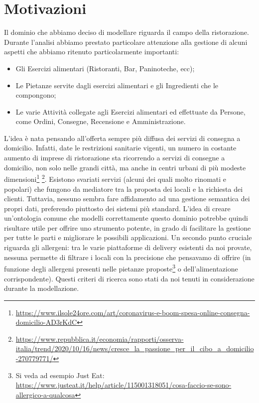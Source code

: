 \documentclass[12pt]{article}
\begin{document}
\section{Motivazioni}
Il dominio che abbiamo deciso di modellare riguarda il campo della ristorazione. 
Durante l'analisi abbiamo prestato particolare attenzione alla gestione di alcuni aspetti che abbiamo ritenuto particolarmente importanti:
\begin{itemize}
    \item Gli Esercizi alimentari (Ristoranti, Bar, Paninoteche, ecc);
    \item Le Pietanze servite dagli esercizi alimentari e gli Ingredienti che le compongono;
    \item Le varie Attività collegate agli Esercizi alimentari ed effettuate da Persone, come Ordini, Consegne, Recensione e Amministrazione.
\end{itemize}
L'idea è nata pensando all'offerta sempre più diffusa dei servizi di consegna a domicilio.
Infatti, date le restrizioni sanitarie vigenti, un numero in costante aumento di imprese di ristorazione sta ricorrendo a servizi di consegne a domicilio, non solo nelle grandi città, ma anche in centri urbani di più modeste dimensioni\footnote{\url{https://www.ilsole24ore.com/art/coronavirus-e-boom-spesa-online-consegna-domicilio-AD3rKdC}} \footnote{\url{https://www.repubblica.it/economia/rapporti/osserva-italia/trend/2020/10/16/news/cresce_la_passione_per_il_cibo_a_domicilio-270779771/}}.\newline
Esistono svariati servizi (alcuni dei quali molto rinomati e popolari) che fungono da mediatore tra la proposta dei locali e la richiesta dei clienti. 
Tuttavia, nessuno sembra fare affidamento ad una gestione semantica dei propri dati, preferendo piuttosto dei sistemi più standard.\newline
L'idea di creare un'ontologia comune che modelli correttamente questo dominio potrebbe quindi risultare utile per offrire uno strumento potente, in grado di facilitare la gestione per tutte le parti e migliorare le possibili applicazioni.\newline
Un secondo punto cruciale riguarda gli allergeni: tra le varie piattaforme di delivery esistenti da noi provate, nessuna permette di filtrare i locali con la precisione che pensavamo di offrire (in funzione degli allergeni presenti nelle pietanze proposte\footnote{Si veda ad esempio Just Eat: \url{https://www.justeat.it/help/article/115001318051/cosa-faccio-se-sono-allergico-a-qualcosa}} o dell'alimentazione corrispondente).
Questi criteri di ricerca sono stati da noi tenuti in considerazione durante la modellazione.
\end{document}
